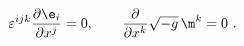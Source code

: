 \begin{equation}
{\varepsilon}^{ijk}\frac{\partial {\e}_i}{\partial x^j}=0,\qquad 
\frac{\partial }{\partial x^k}\sqrt{-g}\,{\m}^k=0\ .
\label{s3}
\end{equation}

